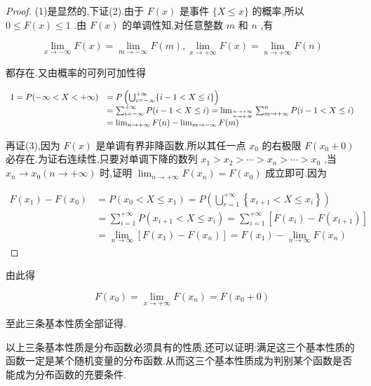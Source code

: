 \begin{proof}
	(1)是显然的,下证(2).由于 $ F(x) $ 是事件 $ \{X \leqslant x\} $ 的概率,所以 $ 0\leq 
	F(x)\leq 1 $ .由 $ F(x) $ 的单调性知,对任意整数 $ m $ 和 $ n $ ,有
	
	\[ 
	\lim _{x \rightarrow-\infty} F(x)=\lim _{m \rightarrow-\infty} F(m), \lim _{x \rightarrow+\infty} F(x)=\lim _{n \rightarrow+\infty} F(n)
	\]
	
	都存在.又由概率的可列可加性得
	
	\[ 
	\begin{array}{ll}
	1=P(-\infty<X<+\infty)&=P\left(\bigcup_{i=-\infty}^{+\infty}\{i-1<X \leqslant i\}\right) \\ &=\sum_{i=-\infty}^{+\infty} P(i-1<X \leqslant i)=\lim _{n \rightarrow+\infty \atop n \rightarrow+\infty} \sum_{m \rightarrow+\infty}^{n} P(i-1<X \leqslant i) \\ &=\lim _{n \rightarrow+\infty} F(n)-\lim _{m \rightarrow-\infty} F(m)
	\end{array}
	\]
	
	再证(3),因为 $ F(x) $ 是单调有界非降函数,所以其任一点 $ x_0 $ 的右极限 $ F(x_0+0) $ 必存在.为证右连续性,只要对单调下降的数列 $ x_{1}>x_{2}>\cdots>x_{n}>\cdots>x_{0} $ ,当 $ x_{n} \rightarrow x_{0}(n \rightarrow+\infty) $ 时,证明 $ \lim _{n \rightarrow+\infty} F\left(x_{n}\right)=F\left(x_{0}\right) $ 成立即可.因为
	
	\[ \begin{array}{ll}
	F\left(x_{1}\right)-F\left(x_{0}\right)&=P\left(x_{0}<X \leqslant x_{1}\right)=P\left(\bigcup_{r=1}^{+\infty}\left\{x_{i+1}<X \leqslant x_{i}\right\}\right) \\
	&=\sum_{i=1}^{+\infty} P\left(x_{i+1}<X \leqslant x_{i}\right)=\sum_{i=1}^{+\infty}\left[F\left(x_{i}\right)-F\left(x_{t+1}\right)\right] \\
	&=\lim _{n \rightarrow \infty}\left[F\left(x_{1}\right)-F\left(x_{n}\right)\right]=F\left(x_{1}\right)-\lim _{n \rightarrow \infty} F\left(x_{n}\right)
	\end{array}\]
\end{proof}

由此得

\[ 
F\left(x_{0}\right)=\lim _{x \rightarrow+\infty} F\left(x_{n}\right)=F\left(x_{0}+0\right)
\]

至此三条基本性质全部证得.

以上三条基本性质是分布函数必须具有的性质,还可以证明:满足这三个基本性质的函数一定是某个随机变量的分布函数.从而这三个基本性质成为判别某个函数是否能成为分布函数的充要条件.

